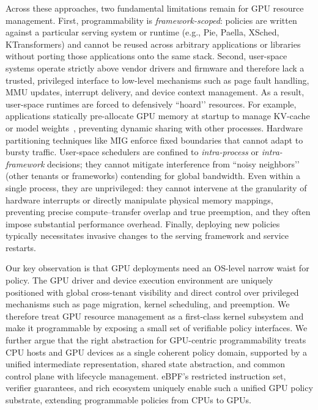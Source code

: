 Across these approaches, two fundamental limitations remain for GPU resource management. First, programmability is \emph{framework-scoped}: policies are written against a particular serving system or runtime (e.g., Pie, Paella, XSched, KTransformers) and cannot be reused across arbitrary applications or libraries without porting those applications onto the same stack. Second, user-space systems operate strictly above vendor drivers and firmware and therefore lack a trusted, privileged interface to low-level mechanisms such as page fault handling, MMU updates, interrupt delivery, and device context management. As a result, user-space runtimes are forced to defensively “hoard’’ resources. For example, applications statically pre-allocate GPU memory at startup to manage KV-cache or model weights~\cite{lmcache}, preventing dynamic sharing with other processes. Hardware partitioning techniques like MIG enforce fixed boundaries that cannot adapt to bursty traffic. User-space schedulers are confined to \emph{intra-process} or \emph{intra-framework} decisions; they cannot mitigate interference from “noisy neighbors’’ (other tenants or frameworks) contending for global bandwidth. Even within a single process, they are unprivileged: they cannot intervene at the granularity of hardware interrupts or directly manipulate physical memory mappings, preventing precise compute–transfer overlap and true preemption, and they often impose substantial performance overhead. Finally, deploying new policies typically necessitates invasive changes to the serving framework and service restarts.

Our key observation is that GPU deployments need an OS-level narrow waist for policy. The GPU driver and device execution environment are uniquely positioned with global cross-tenant visibility and direct control over privileged mechanisms such as page migration, kernel scheduling, and preemption. We therefore treat GPU resource management as a first-class kernel subsystem and make it programmable by exposing a small set of verifiable policy interfaces. We further argue that the right abstraction for GPU-centric programmability treats CPU hosts and GPU devices as a single coherent policy domain, supported by a unified intermediate representation, shared state abstraction, and common control plane with lifecycle management. eBPF’s restricted instruction set, verifier guarantees, and rich ecosystem uniquely enable such a unified GPU policy substrate, extending programmable policies from CPUs to GPUs.


